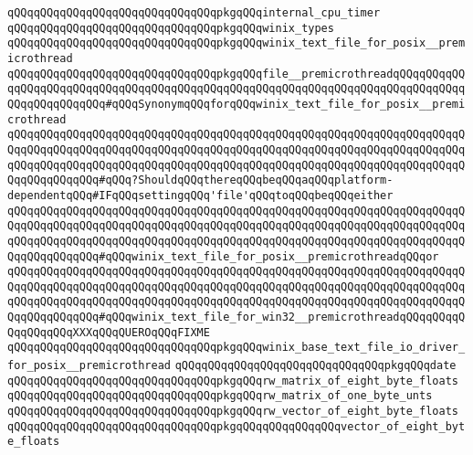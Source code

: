 \verb|qQQqqQQqqQQqqQQqqQQqqQQqqQQqqQQqpkgqQQqinternal_cpu_timer|\newline
\newline
\verb|qQQqqQQqqQQqqQQqqQQqqQQqqQQqqQQqpkgqQQqwinix_types|\newline
\verb|qQQqqQQqqQQqqQQqqQQqqQQqqQQqqQQqpkgqQQqwinix_text_file_for_posix__premicrothread|\newline
\verb|qQQqqQQqqQQqqQQqqQQqqQQqqQQqqQQqpkgqQQqfile__premicrothreadqQQqqQQqqQQqqQQqqQQqqQQqqQQqqQQqqQQqqQQqqQQqqQQqqQQqqQQqqQQqqQQqqQQqqQQqqQQqqQQqqQQqqQQqqQQqqQQq#qQQqSynonymqQQqforqQQqwinix_text_file_for_posix__premicrothread|\newline
\verb|qQQqqQQqqQQqqQQqqQQqqQQqqQQqqQQqqQQqqQQqqQQqqQQqqQQqqQQqqQQqqQQqqQQqqQQqqQQqqQQqqQQqqQQqqQQqqQQqqQQqqQQqqQQqqQQqqQQqqQQqqQQqqQQqqQQqqQQqqQQqqQQqqQQqqQQqqQQqqQQqqQQqqQQqqQQqqQQqqQQqqQQqqQQqqQQqqQQqqQQqqQQqqQQqqQQqqQQqqQQqqQQq#qQQq?ShouldqQQqthereqQQqbeqQQqaqQQqplatform-dependentqQQq#IFqQQqsettingqQQq'file'qQQqtoqQQqbeqQQqeither|\newline
\verb|qQQqqQQqqQQqqQQqqQQqqQQqqQQqqQQqqQQqqQQqqQQqqQQqqQQqqQQqqQQqqQQqqQQqqQQqqQQqqQQqqQQqqQQqqQQqqQQqqQQqqQQqqQQqqQQqqQQqqQQqqQQqqQQqqQQqqQQqqQQqqQQqqQQqqQQqqQQqqQQqqQQqqQQqqQQqqQQqqQQqqQQqqQQqqQQqqQQqqQQqqQQqqQQqqQQqqQQqqQQqqQQq#qQQqwinix_text_file_for_posix__premicrothreadqQQqor|\newline
\verb|qQQqqQQqqQQqqQQqqQQqqQQqqQQqqQQqqQQqqQQqqQQqqQQqqQQqqQQqqQQqqQQqqQQqqQQqqQQqqQQqqQQqqQQqqQQqqQQqqQQqqQQqqQQqqQQqqQQqqQQqqQQqqQQqqQQqqQQqqQQqqQQqqQQqqQQqqQQqqQQqqQQqqQQqqQQqqQQqqQQqqQQqqQQqqQQqqQQqqQQqqQQqqQQqqQQqqQQqqQQqqQQq#qQQqwinix_text_file_for_win32__premicrothreadqQQqqQQqqQQqqQQqqQQqXXXqQQqQUEROqQQqFIXME|\newline
\newline
\verb|qQQqqQQqqQQqqQQqqQQqqQQqqQQqqQQqpkgqQQqwinix_base_text_file_io_driver_for_posix__premicrothread|\newline
\verb|qQQqqQQqqQQqqQQqqQQqqQQqqQQqqQQqpkgqQQqdate|\newline
\newline
\verb|qQQqqQQqqQQqqQQqqQQqqQQqqQQqqQQqpkgqQQqrw_matrix_of_eight_byte_floats|\newline
\verb|qQQqqQQqqQQqqQQqqQQqqQQqqQQqqQQqpkgqQQqrw_matrix_of_one_byte_unts|\newline
\newline
\verb|qQQqqQQqqQQqqQQqqQQqqQQqqQQqqQQqpkgqQQqrw_vector_of_eight_byte_floats|\newline
\verb|qQQqqQQqqQQqqQQqqQQqqQQqqQQqqQQqpkgqQQqqQQqqQQqqQQqvector_of_eight_byte_floats|\newline
